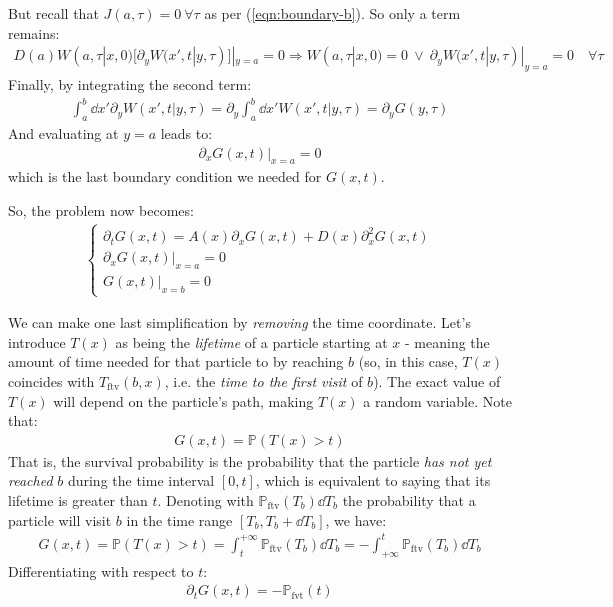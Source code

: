 \documentclass[../template.tex]{subfiles}
\begin{document}
But recall that $J(a,\tau) = 0\> \forall \tau$ as per (\ref{eqn:boundary-b}). So only a term remains:
\begin{align*}
    D(a) W(a, \tau|x,0) [\partial_y W(x',t|y,\tau)]|_{y=a} = 0 \Rightarrow W(a, \tau|x,0) = 0 \> \lor \> \partial_y W(x',t|y,\tau)|_{y=a} = 0 \quad \forall \tau 
\end{align*}
Finally, by integrating the second term:
\begin{align*}
    \int_a^b \dd{x'} \partial_y W(x',t|y,\tau) = \partial_y \int_a^b \dd{x'}W(x',t|y, \tau) = \partial_y G(y, \tau)
\end{align*}
And evaluating at $y = a$ leads to:
\begin{align}
    \partial_x G(x,t) |_{x=a} = 0 \label{eqn:Gboundary-a}
\end{align}
which is the last boundary condition we needed for $G(x,t)$.

So, the problem now becomes:
\begin{align*}
    \begin{cases}
        \partial_t G(x,t) = A(x) \partial_x G(x,t) + D(x) \partial_{x}^2 G(x,t)\\
        \partial_x G(x,t)|_{x=a} = 0\\
        G(x,t)|_{x=b} = 0
    \end{cases}
\end{align*}

We can make one last simplification by \textit{removing} the time coordinate. Let's introduce $T(x)$ as being the \textit{lifetime} of a particle starting at $x$ - meaning the amount of time needed for that particle to  by reaching $b$ (so, in this case, $T(x)$ coincides with $T_{\mathrm{ftv}}(b,x)$, i.e. the \textit{time to the first visit} of $b$). The exact value of $T(x)$ will depend on the particle's path, making $T(x)$ a random variable. Note that:
\begin{align*}
    G(x,t) = \mathbb{P}(T(x) > t)
\end{align*}   
That is, the survival probability is the probability that the particle \textit{has not yet reached} $b$ during the time interval $[0,t]$, which is equivalent to saying that its lifetime is greater than $t$. Denoting with $\mathbb{P}_{\mathrm{ftv}}(T_b) \dd{T_b}$ the probability that a particle will visit $b$ in the time range $[T_b, T_b+\dd{T_b}]$, we have:
\begin{align*}
    G(x,t) = \mathbb{P}(T(x) > t) = \int_t^{+\infty} \mathbb{P}_{\mathrm{ftv}}(T_b) \dd{T_b} = -\int_{+\infty}^t \mathbb{P}_{\mathrm{ftv}}(T_b) \dd{T_b}
\end{align*}
Differentiating with respect to $t$:
\begin{align*}
    \partial_t G(x,t) = - \mathbb{P}_{\mathrm{fvt}}(t)
\end{align*} %
\end{document}
